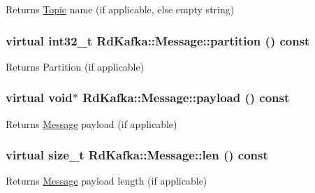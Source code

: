 \label{classRdKafka_1_1Message_a02e16f76e8d248fe47e0f09ff2d13492}
\begin{DoxyReturn}{Returns}
\hyperlink{classRdKafka_1_1Topic}{Topic} name (if applicable, else empty string) 
\end{DoxyReturn}
\hypertarget{classRdKafka_1_1Message_aebc6b57026d44ade6c75d5e421fa4384}{
\subsubsection[{partition}]{\setlength{\rightskip}{0pt plus 5cm}virtual int32\_\-t RdKafka::Message::partition () const}}
\label{classRdKafka_1_1Message_aebc6b57026d44ade6c75d5e421fa4384}
\begin{DoxyReturn}{Returns}
Partition (if applicable) 
\end{DoxyReturn}
\hypertarget{classRdKafka_1_1Message_ae7426658cd22855e80d3169b85ca2d27}{
\subsubsection[{payload}]{\setlength{\rightskip}{0pt plus 5cm}virtual void$\ast$ RdKafka::Message::payload () const}}
\label{classRdKafka_1_1Message_ae7426658cd22855e80d3169b85ca2d27}
\begin{DoxyReturn}{Returns}
\hyperlink{classRdKafka_1_1Message}{Message} payload (if applicable) 
\end{DoxyReturn}
\hypertarget{classRdKafka_1_1Message_a68d94e027f0df784632880d24a43b3f9}{
\subsubsection[{len}]{\setlength{\rightskip}{0pt plus 5cm}virtual size\_\-t RdKafka::Message::len () const}}
\label{classRdKafka_1_1Message_a68d94e027f0df784632880d24a43b3f9}
\begin{DoxyReturn}{Returns}
\hyperlink{classRdKafka_1_1Message}{Message} payload length (if applicable) 
\end{DoxyReturn}
